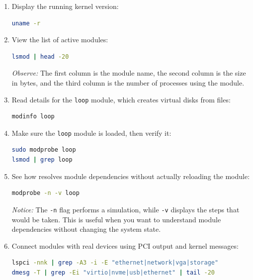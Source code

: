 \begin{enumerate}
    \item Display the running kernel version:
\begin{lstlisting}[language=bash, caption={Active kernel version}]
uname -r
\end{lstlisting}

    \item View the list of active modules:
\begin{lstlisting}[language=bash, caption={Active kernel module list}]
lsmod | head -20
\end{lstlisting}
    \textit{Observe:} The first column is the module name, the second column is the size in bytes, and the third column is the number of processes using the module.

    \item Read details for the \texttt{loop} module, which creates virtual disks from files:
\begin{lstlisting}[language=bash, caption={Loop module details}]
modinfo loop
\end{lstlisting}

    \item Make sure the \texttt{loop} module is loaded, then verify it:
\begin{lstlisting}[language=bash, caption={Load and verify the loop module}]
sudo modprobe loop
lsmod | grep loop
\end{lstlisting}

    \item See how  resolves module dependencies without actually reloading the module:
\begin{lstlisting}[language=bash, caption={Simulating module loading and dependencies}]
modprobe -n -v loop
\end{lstlisting}
    \textit{Notice:} The \texttt{-n} flag performs a simulation, while \texttt{-v} displays the steps that would be taken. This is useful when you want to understand module dependencies without changing the system state.

    \item Connect modules with real devices using PCI output and kernel messages:
\begin{lstlisting}[language=bash, caption={Connecting modules, devices, and kernel messages}]
lspci -nnk | grep -A3 -i -E "ethernet|network|vga|storage"
dmesg -T | grep -Ei "virtio|nvme|usb|ethernet" | tail -20
\end{lstlisting}
\end{enumerate}

